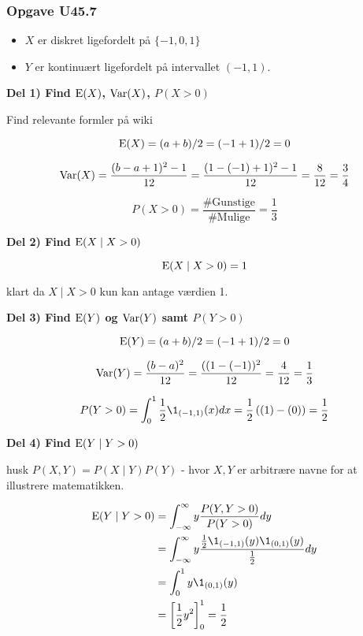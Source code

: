 \subsubsection{Opgave U45.7}

\begin{itemize}
    \item $X$ er diskret ligefordelt på $\{-1, 0, 1\}$
    \item $Y$ er kontinuært ligefordelt på intervallet $(-1,1)$.
\end{itemize}

\textbf{Del 1) Find $\text{E}(X)$, $\text{Var}(X)$, $P(X>0)$}

Find relevante formler på wiki

\begin{equation}
    \text{E}(X) = (a + b)/2 = (-1 + 1)/2 = 0
\end{equation}

\begin{equation}
    \text{Var}(X) = \frac{(b - a + 1)^2 - 1}{12} = \frac{(1 - (-1) +1)^2 -1}{12} = \frac{8}{12} = \frac{3}{4}
\end{equation}

\begin{equation}
    P(X > 0) = \frac{\text{\# Gunstige}}{\text{\# Mulige}} = \frac{1}{3} 
\end{equation}

\textbf{Del 2) Find $\text{E}(X \mid X >0)$}

\begin{equation}
    \text{E}( X \mid X > 0) = 1
\end{equation}

klart da $X \mid X > 0$ kun kan antage værdien 1.

\textbf{Del 3) Find $\text{E}(Y)$ og $\text{Var}(Y)$ samt $P(Y>0)$}

\begin{equation}
    \text{E}(Y) = (a + b)/2 = (-1 + 1)/2 = 0
\end{equation}

\begin{equation}
    \text{Var}(Y) = \frac{(b - a)^2}{12} = \frac{((1 - (-1) )^2}{12} = \frac{4}{12} = \frac{1}{3}
\end{equation}

\begin{equation}
    P(Y > 0) = \int_{0}^{1} \frac{1}{2}\1_{(-1,1)}(x) dx = \frac{1}{2}\lp (1) - (0) \rp = \frac{1}{2} 
\end{equation}

\textbf{Del 4) Find $\text{E}(Y \mid Y >0)$}

husk $P(X,Y) = P(X \mid Y) P(Y)$ - hvor $X,Y$ er arbitrære navne for at illustrere matematikken.

\begin{align}
    \E(Y \mid Y>0) &= \int_{-\infty}^{\infty} y \frac{P(Y, Y>0)}{P(Y > 0)} dy\\&= \int_{-\infty}^{\infty} y 
    \frac{\frac{1}{2}\1_{(-1 , 1)}(y) \1_{(0,1)}(y)}{\frac{1}{2}} dy \\
    &= \int_0^1
    y \1_{(0,1)}(y)\\
    &= \lsp \frac{1}{2} y^2 \rsp_0^{1} = \frac{1}{2}
\end{align}
